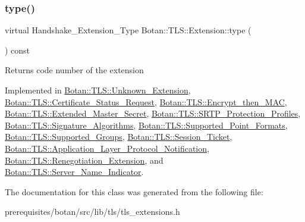 \mbox{\label{class_botan_1_1_t_l_s_1_1_extension_ac8819b312ce604453225e7b4f7c373ec}} 
\subsubsection{\texorpdfstring{type()}{type()}}
{\footnotesize\ttfamily virtual Handshake\+\_\+\+Extension\+\_\+\+Type Botan\+::\+T\+L\+S\+::\+Extension\+::type (\begin{DoxyParamCaption}{ }\end{DoxyParamCaption}) const\hspace{0.3cm}{\ttfamily [pure virtual]}}

\begin{DoxyReturn}{Returns}
code number of the extension 
\end{DoxyReturn}


Implemented in \mbox{\hyperlink{class_botan_1_1_t_l_s_1_1_unknown___extension_a3662bce2ca66c928000baba33369623d}{Botan\+::\+T\+L\+S\+::\+Unknown\+\_\+\+Extension}}, \mbox{\hyperlink{class_botan_1_1_t_l_s_1_1_certificate___status___request_a30a98ada0f7b8cfaec9514794a22f54f}{Botan\+::\+T\+L\+S\+::\+Certificate\+\_\+\+Status\+\_\+\+Request}}, \mbox{\hyperlink{class_botan_1_1_t_l_s_1_1_encrypt__then___m_a_c_a56854b4e65b0cf1395b3b053df42f4f3}{Botan\+::\+T\+L\+S\+::\+Encrypt\+\_\+then\+\_\+\+M\+AC}}, \mbox{\hyperlink{class_botan_1_1_t_l_s_1_1_extended___master___secret_a4e0c181be783e0c301c286ffacd682ef}{Botan\+::\+T\+L\+S\+::\+Extended\+\_\+\+Master\+\_\+\+Secret}}, \mbox{\hyperlink{class_botan_1_1_t_l_s_1_1_s_r_t_p___protection___profiles_a7d0e938631996e86ceab9f94092f9119}{Botan\+::\+T\+L\+S\+::\+S\+R\+T\+P\+\_\+\+Protection\+\_\+\+Profiles}}, \mbox{\hyperlink{class_botan_1_1_t_l_s_1_1_signature___algorithms_a9a316f000ee5c6eb181e6109bbc40b55}{Botan\+::\+T\+L\+S\+::\+Signature\+\_\+\+Algorithms}}, \mbox{\hyperlink{class_botan_1_1_t_l_s_1_1_supported___point___formats_aeaf44021244451a57f6c257f13aa0a7d}{Botan\+::\+T\+L\+S\+::\+Supported\+\_\+\+Point\+\_\+\+Formats}}, \mbox{\hyperlink{class_botan_1_1_t_l_s_1_1_supported___groups_ab3126c91ffe1b598019892ed08117a67}{Botan\+::\+T\+L\+S\+::\+Supported\+\_\+\+Groups}}, \mbox{\hyperlink{class_botan_1_1_t_l_s_1_1_session___ticket_a0fb84fe33c30d28e0dee120ecc2fe228}{Botan\+::\+T\+L\+S\+::\+Session\+\_\+\+Ticket}}, \mbox{\hyperlink{class_botan_1_1_t_l_s_1_1_application___layer___protocol___notification_ab60d32531c669dd0d23fdddec69eee17}{Botan\+::\+T\+L\+S\+::\+Application\+\_\+\+Layer\+\_\+\+Protocol\+\_\+\+Notification}}, \mbox{\hyperlink{class_botan_1_1_t_l_s_1_1_renegotiation___extension_a68950eaadf339a1c739e044e9fdff665}{Botan\+::\+T\+L\+S\+::\+Renegotiation\+\_\+\+Extension}}, and \mbox{\hyperlink{class_botan_1_1_t_l_s_1_1_server___name___indicator_a3ecbe137658cbab2797a05441e65f42f}{Botan\+::\+T\+L\+S\+::\+Server\+\_\+\+Name\+\_\+\+Indicator}}.



The documentation for this class was generated from the following file\+:\begin{DoxyCompactItemize}
\item 
prerequisites/botan/src/lib/tls/tls\+\_\+extensions.\+h\end{DoxyCompactItemize}
